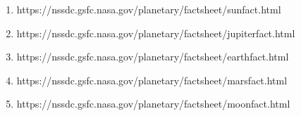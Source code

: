 \begin{enumerate}
\begin{enumerate}
    \begin{enumerate}
      \item https://nssdc.gsfc.nasa.gov/planetary/factsheet/sunfact.html
      \item https://nssdc.gsfc.nasa.gov/planetary/factsheet/jupiterfact.html
      \item https://nssdc.gsfc.nasa.gov/planetary/factsheet/earthfact.html
      \item https://nssdc.gsfc.nasa.gov/planetary/factsheet/marsfact.html
      \item https://nssdc.gsfc.nasa.gov/planetary/factsheet/moonfact.html
    \end{enumerate}
      \end{enumerate}
    \end{enumerate}

